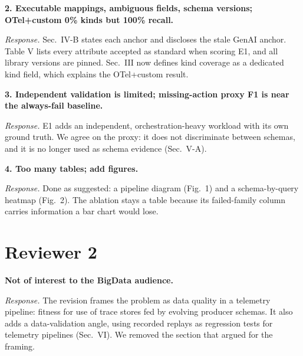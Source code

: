 \documentclass[10pt]{article}
\newcommand{\rc}[1]{\par\medskip\textbf{#1}\par}
\newcommand{\resp}{\par\emph{Response.} }
\begin{document}
\rc{2. Executable mappings, ambiguous fields, schema versions; OTel+custom
0\% kinds but 100\% recall.}
\resp Sec.~IV-B states each anchor and discloses the stale GenAI anchor.
Table V lists every attribute accepted as standard when scoring E1, and
all library versions are pinned. Sec.~III now defines kind coverage as a
dedicated kind field, which explains the OTel+custom result.

\rc{3. Independent validation is limited; missing-action proxy F1 is near
the always-fail baseline.}
\resp E1 adds an independent, orchestration-heavy workload with its own
ground truth. We agree on the proxy: it does not discriminate between
schemas, and it is no longer used as schema evidence (Sec.~V-A).

\rc{4. Too many tables; add figures.}
\resp Done as suggested: a pipeline diagram (Fig.~1) and a schema-by-query
heatmap (Fig.~2). The ablation stays a table because its failed-family
column carries information a bar chart would lose.

\section*{Reviewer 2}
\rc{Not of interest to the BigData audience.}
\resp The revision frames the problem as data quality in a telemetry
pipeline: fitness for use of trace stores fed by evolving producer
schemas. It also adds a data-validation angle, using recorded replays as
regression tests for telemetry pipelines (Sec.~VI). We removed the
section that argued for the framing.
\end{document}
